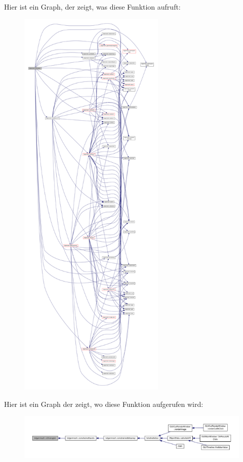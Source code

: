 Hier ist ein Graph, der zeigt, was diese Funktion aufruft\-:
\nopagebreak
\begin{figure}[H]
\begin{center}
\leavevmode
\includegraphics[height=550pt]{classtetgenmesh_aa34a5188a4cee82197394560c388c348_cgraph}
\end{center}
\end{figure}




Hier ist ein Graph der zeigt, wo diese Funktion aufgerufen wird\-:
\nopagebreak
\begin{figure}[H]
\begin{center}
\leavevmode
\includegraphics[width=350pt]{classtetgenmesh_aa34a5188a4cee82197394560c388c348_icgraph}
\end{center}
\end{figure}


